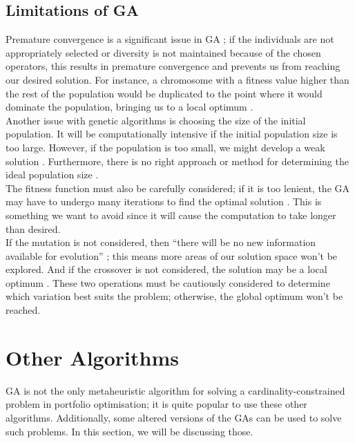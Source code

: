 \documentclass[12pt]{report}
\begin{document}
\subsection{Limitations of GA}
Premature convergence is a significant issue in GA \cite{source1,source4}; if the individuals are not appropriately selected or diversity is not maintained because of the chosen operators, this results in premature convergence and prevents us from reaching our desired solution. For instance, a chromosome with a fitness value higher than the rest of the population would be duplicated to the point where it would dominate the population, bringing us to a local optimum \cite{source4}. 
\\ \newline \noindent
Another issue with genetic algorithms is choosing the size of the initial population. It will be computationally intensive if the initial population size is too large. However, if the population is too small, we might develop a weak solution \cite{source1}. Furthermore, there is no right approach or method for determining the ideal population size \cite{source4}.
\\ \newline \noindent
The fitness function must also be carefully considered; if it is too lenient, the GA may have to undergo many iterations to find the optimal solution \cite{source1}. This is something we want to avoid since it will cause the computation to take longer than desired.
\\ \newline \noindent
If the mutation is not considered, then “there will be no new information available for evolution” \cite{source1}; this means more areas of our solution space won’t be explored. And if the crossover is not considered, the solution may be a local optimum \cite{source1}. These two operations must be cautiously considered to determine which variation best suits the problem; otherwise, the global optimum won't be reached.
\section{Other Algorithms}
GA is not the only metaheuristic algorithm for solving a cardinality-constrained problem in portfolio optimisation; it is quite popular to use these other algorithms. Additionally, some altered versions of the GAs can be used to solve such problems. In this section, we will be discussing those.
\end{document}
